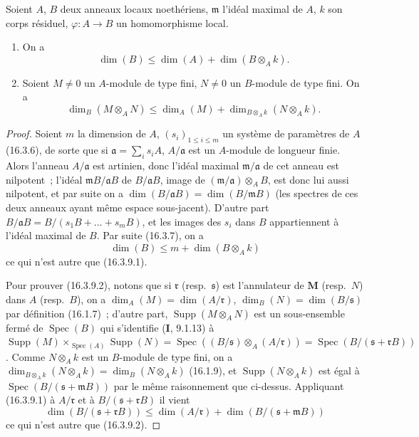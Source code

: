 \begin{proposition}[16.3.9]
\label{0.16.3.9-fr}
Soient $A$, $B$ deux anneaux locaux noethériens, $\mathfrak{m}$ l'idéal maximal
de $A$, $k$ son corps résiduel, $\varphi:A\to B$ un homomorphisme local.
\begin{enumerate}
  \item[\rm{(i)}] On a
  \begin{equation}
  \label{0.16.3.9.1-fr}
  \tag{16.3.9.1}
    \dim(B)\leq\dim(A)+\dim(B\otimes_A k).
  \end{equation}
  \item[\rm{(ii)}] Soient $M\neq0$ un $A$-module de type fini, $N\neq0$ un
  $B$-module de type fini. On a
  \begin{equation}
  \label{0.16.3.9.2-fr}
  \tag{16.3.9.2}
    \dim_B(M\otimes_A N)
    \leq\dim_A(M)+\dim_{B\otimes_A k}(N\otimes_A k).
  \end{equation}
\end{enumerate}
\end{proposition}

\begin{proof}
Soient $m$ la dimension de $A$, $(s_i)_{1\leq i\leq m}$ un système de
paramètres de $A$ (16.3.6), de sorte que si
$\mathfrak{a}=\sum_i s_iA$, $A/\mathfrak{a}$ est un $A$-module de longueur
finie. Alors l'anneau $A/\mathfrak{a}$ est artinien, donc l'idéal maximal
$\mathfrak{m}/\mathfrak{a}$ de cet anneau est nilpotent~; l'idéal
$\mathfrak{m}B/\mathfrak{a}B$ de $B/\mathfrak{a}B$, image de
$(\mathfrak{m}/\mathfrak{a})\otimes_A B$, est donc lui aussi nilpotent, et par
suite on a
$\dim(B/\mathfrak{a}B)=\dim(B/\mathfrak{m}B)$ (les spectres de ces deux
anneaux ayant même espace sous-jacent). D'autre part
$B/\mathfrak{a}B=B/(s_1B+\ldots+s_mB)$, et les images des $s_i$ dans $B$
appartiennent à l'idéal maximal de $B$. Par suite (16.3.7), on a
\[
  \dim(B)\leq m+\dim(B\otimes_A k)
\]
ce qui n'est autre que (16.3.9.1).

Pour prouver (16.3.9.2), notons que si $\mathfrak{r}$ (resp.~$\mathfrak{s}$)
est l'annulateur de $\mathbf{M}$ (resp.~$N$)
dans $A$ (resp.~$B$), on a
$\dim_A(M)=\dim(A/\mathfrak{r})$, $\dim_B(N)=\dim(B/\mathfrak{s})$ par
définition (16.1.7)~; d'autre part, $\operatorname{Supp}(M\otimes_A N)$ est un
sous-ensemble fermé de $\operatorname{Spec}(B)$ qui s'identifie (\textbf{I}, 9.1.13) à
$\operatorname{Supp}(M)\times_{\operatorname{Spec}(A)}\operatorname{Supp}(N)=\operatorname{Spec}((B/\mathfrak{s})\otimes_A(A/\mathfrak{r}))=\operatorname{Spec}(B/(\mathfrak{s}+\mathfrak{r}B))$.
Comme $N\otimes_A k$ est un $B$-module de type fini, on a
$\dim_{B\otimes_A k}(N\otimes_A k)=\dim_B(N\otimes_A k)$ (16.1.9), et
$\operatorname{Supp}(N\otimes_A k)$ est égal à
$\operatorname{Spec}(B/(\mathfrak{s}+\mathfrak{m}B))$ par le même raisonnement
que ci-dessus. Appliquant (16.3.9.1) à $A/\mathfrak{r}$ et à
$B/(\mathfrak{s}+\mathfrak{r}B)$ il vient
\[
  \dim(B/(\mathfrak{s}+\mathfrak{r}B))
  \leq\dim(A/\mathfrak{r})+
  \dim(B/(\mathfrak{s}+\mathfrak{m}B))
\]
ce qui n'est autre que (16.3.9.2).
\end{proof}

